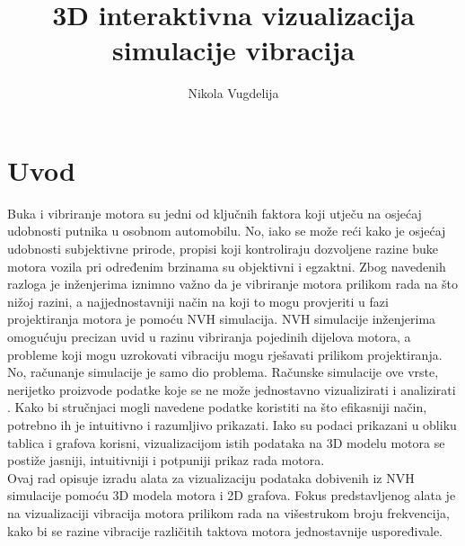 \documentclass[times, utf8, diplomski]{fer}
\begin{document}

\title{3D interaktivna vizualizacija simulacije vibracija}

\author{Nikola Vugdelija}

\maketitle





\tableofcontents

\listoffigures

\chapter{Uvod}
Buka i vibriranje motora su jedni od ključnih faktora koji utječu na osjećaj udobnosti putnika u osobnom automobilu. No, iako se može reći kako je osjećaj udobnosti subjektivne prirode, propisi koji kontroliraju dozvoljene razine buke motora vozila pri određenim brzinama su objektivni i egzaktni. Zbog navedenih razloga je inženjerima iznimno važno da je vibriranje motora prilikom rada na što nižoj razini, a najjednostavniji način na koji to mogu provjeriti u fazi projektiranja motora je pomoću NVH  simulacija. NVH simulacije inženjerima omogućuju precizan uvid u razinu vibriranja pojedinih dijelova motora, a probleme koji mogu uzrokovati vibraciju mogu rješavati prilikom projektiranja.\\

No, računanje simulacije je samo dio problema. Računske simulacije ove vrste, nerijetko proizvode podatke koje se ne može jednostavno vizualizirati i analizirati \citep{matkovic2021getting}. Kako bi stručnjaci mogli navedene podatke koristiti na što efikasniji način, potrebno ih je intuitivno i razumljivo prikazati. Iako su podaci prikazani u obliku tablica i grafova korisni, vizualizacijom istih podataka na 3D modelu motora se postiže jasniji, intuitivniji i potpuniji prikaz rada motora.\\

Ovaj rad opisuje izradu alata za vizualizaciju podataka dobivenih iz NVH simulacije pomoću 3D modela motora i 2D grafova. Fokus predstavljenog alata je na vizualizaciji vibracija motora prilikom rada na višestrukom broju frekvencija, kako bi se razine vibracije različitih taktova motora jednostavnije uspoređivale.
\end{document}
